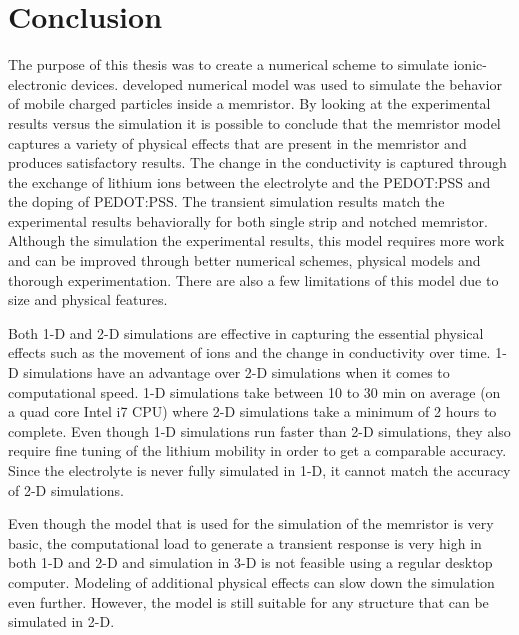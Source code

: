 \chapter{Conclusion} %

\label{Chapter8} %


\begin{doublespace}

The purpose of this thesis was to create a numerical scheme to simulate ionic-electronic devices.  developed numerical model was used to simulate the behavior of mobile charged particles inside a memristor. By looking at the experimental results versus the simulation it is possible to conclude that the memristor model captures a variety of physical effects that are present in the memristor and produces satisfactory results. The change in the conductivity is captured through the exchange of lithium ions between the electrolyte and the PEDOT:PSS and the doping of PEDOT:PSS. The transient simulation results match the experimental results behaviorally for both single strip and notched memristor. Although the simulation  the experimental results, this model requires more work and can be improved through better numerical schemes, physical models and thorough experimentation. There are also a few limitations of this model due to  size and physical features.

Both 1-D and 2-D simulations are effective in capturing the essential physical effects such as the movement of ions and the change in conductivity over time. 1-D simulations have an advantage over 2-D simulations when it comes to computational speed. 1-D simulations take between 10 to 30 min on average (on a quad core Intel i7 CPU) where 2-D simulations take a minimum of 2 hours to complete. Even though 1-D simulations run faster than 2-D simulations, they also require fine tuning of the lithium mobility in order to get a comparable accuracy. Since the electrolyte is never fully simulated in 1-D, it cannot match the accuracy of 2-D simulations.

Even though the model that is used for the simulation of the memristor is very basic, the computational load to generate a transient response is very high in both 1-D and 2-D and  simulation in 3-D is not feasible using a regular desktop computer. Modeling of additional physical effects can slow down the simulation even further. However, the model is still suitable for any structure that can be simulated in 2-D.  


\end{doublespace}
